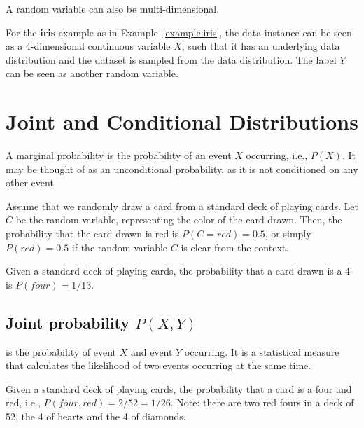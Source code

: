 A random variable can also be multi-dimensional. 

\begin{example}
For the \textbf{iris} example as in Example~\ref{example:iris}, the data instance can be seen as a 4-dimensional continuous variable $X$, such that it has an underlying data distribution and the dataset is sampled from the data distribution. The label $Y$ can be seen as another random variable.    
\end{example}



\section{Joint and Conditional Distributions}

A marginal probability is the probability of an event $X$ occurring, i.e., $P(X)$. It may be thought of as an unconditional probability, as it is not conditioned on any other event.

\begin{example}
Assume that we randomly draw a card from a standard deck of playing cards. Let $C$ be the random variable, representing the color of the card drawn. Then, the probability that the card drawn is red is $P(C = red) = 0.5$, or simply $P(red) = 0.5$ if the random variable $C$ is clear from the context.
\end{example}

\begin{example}
Given a standard deck of playing cards, the probability that a card drawn is a 4 is $P(four)=1/13$.
\end{example}

\subsection*{Joint probability $P(X,Y)$} 
is the probability of event $X$ and event $Y$ occurring. It is a statistical measure that calculates the likelihood of two events occurring at the same time. %

\begin{example}
Given a standard deck of playing cards, the probability that a card is a four and red, i.e., $P(four, red) = 2/52=1/26$. Note: there are two red fours in a deck of 52, the 4 of hearts and the 4 of diamonds.
\end{example}


